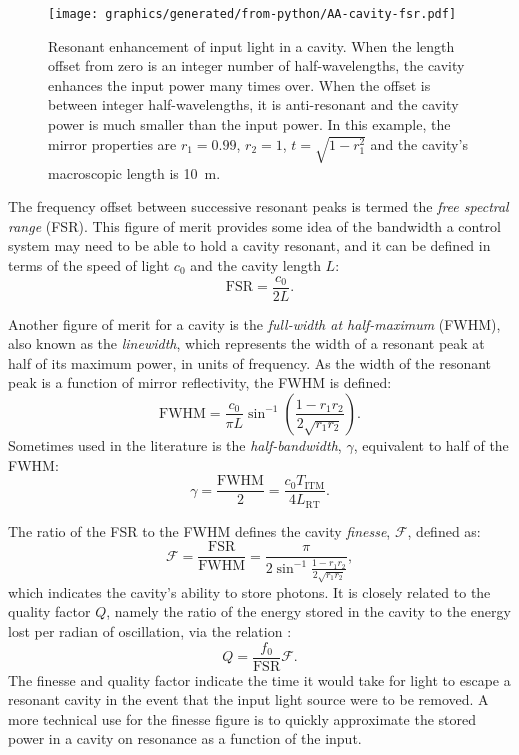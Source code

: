 \begin{figure}
  \centering
  \texttt{[image: graphics/generated/from-python/AA-cavity-fsr.pdf]}
  \caption[Resonant enhancement of input light in a cavity]{\label{fig:cavity-fsr}Resonant enhancement of input light in a cavity. When the length offset from zero is an integer number of half-wavelengths, the cavity enhances the input power many times over. When the offset is between integer half-wavelengths, it is anti-resonant and the cavity power is much smaller than the input power. In this example, the mirror properties are $r_1 = 0.99$, $r_2 = 1$, $t = \sqrt{1 - r_1^2}$ and the cavity's macroscopic length is \SI{10}{\meter}.}
\end{figure}

The frequency offset between successive resonant peaks is termed the \emph{free spectral range} (\gls{FSR}). This figure of merit provides some idea of the bandwidth a control system may need to be able to hold a cavity resonant, and it can be defined in terms of the speed of light $c_0$ and the cavity length $L$:
\begin{equation}
  \label{eq:fsr}
  \text{FSR} = \frac{c_0}{2L}.
\end{equation}

Another figure of merit for a \FP{} cavity is the \emph{full-width at half-maximum} (\gls{FWHM}), also known as the \emph{linewidth}, which represents the width of a resonant peak at half of its maximum power, in units of frequency. As the width of the resonant peak is a function of mirror reflectivity, the \gls{FWHM} is defined:
\begin{equation}
  \text{FWHM} = \frac{c_0}{\pi L} \sin^{-1}{\left( \frac{1 - r_1 r_2}{2 \sqrt{r_1 r_2}} \right)}.
\end{equation}
Sometimes used in the literature is the \emph{half-bandwidth}, $\gamma$, equivalent to half of the \gls{FWHM}:
\begin{equation}
  \gamma = \frac{\text{FWHM}}{2} = \frac{c_{0} T_{\textrm{ITM}}}{4 L_{\textrm{RT}}}.
\end{equation}

The ratio of the \gls{FSR} to the \gls{FWHM} defines the cavity \emph{finesse}, $\mathcal{F}$, defined as:
\begin{equation}
  \mathcal{F} = \frac{\text{FSR}}{\text{FWHM}} = \frac{\pi}{2 \sin^{-1}{\frac{1 - r_1 r_2}{2 \sqrt{r_1 r_2}}}},
\end{equation}
which indicates the cavity's ability to store photons. It is closely related to the quality factor $Q$, namely the ratio of the energy stored in the cavity to the energy lost per radian of oscillation, via the relation \cite{Band2006}:
\begin{equation}
Q = \frac{f_0}{\text{FSR}} \mathcal{F}.
\end{equation}
The finesse and quality factor indicate the time it would take for light to escape a resonant cavity in the event that the input light source were to be removed. A more technical use for the finesse figure is to quickly approximate the stored power in a cavity on resonance as a function of the input.

